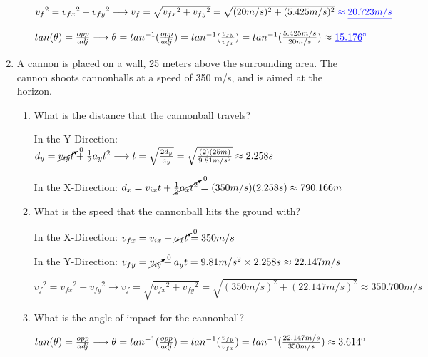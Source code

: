 \documentclass[letterpaper, 12pt]{article}
\begin{document}
\begin{enumerate}
\begin{enumerate}
	$ {v_f}^2 = {v_{fx}}^2 + {v_{fy}}^2 \longrightarrow {v_f} = \sqrt{{v_{fx}}^2 + {v_{fy}}^2} = \sqrt{(20 m/s)^2 + (5.425 m/s)^2}  \color{blue} \approx \underline{20.723 m/s}  $
	\color{red}	
	
		$tan(\theta) = \frac{opp}{adj} \longrightarrow \theta = tan^{-1}(\frac{opp}{adj}) = tan^{-1}(\frac{v_{fy}}{v_{fx}}) =  tan^{-1}(\frac{5.425 m/s}{20 m/s}) \approx \color{blue} \underline{15.176} \degree  $
	
	
	\color{black}
	
	
	
\end{enumerate}


\item A cannon is placed on a wall, 25 meters above the surrounding area.  The cannon shoots cannonballs at a speed of 350 m/s, and is aimed at the horizon.  
\begin{enumerate}
	\item What is the distance that the cannonball travels?
	\color{red}

	In the Y-Direction: $d_y = \cancelto{0}{v_{iy}t} + \frac{1}{2}a_y t^2 \longrightarrow t = \sqrt{\frac{2 d_y}{a_y}} = \sqrt{\frac{(2) (25m)}{9.81 m/s^2}} \approx 2.258 s $

In the X-Direction: $d_x = v_{ix} t + \cancelto{0}{\frac{1}{2}a_x t^2}  = (350 m/s)(2.258s) \approx 790.166 m $

\color{black}

	\item What is the speed that the cannonball hits the ground with?
	\color{red}
	
In the X-Direction: $ v_{fx} = v_{ix} + \cancelto{0}{a_x t} = 350 m/s$

In the Y-Direction: $ v_{fy} = \cancelto{0}{v_{iy}} + a_y t = 9.81 m/s^2 \times 2.258s \approx 22.147 m/s$

$ {v_f}^2 = {v_{fx}}^2 + {v_{fy}}^2 \longrightarrow {v_f} = \sqrt{{v_{fx}}^2 + {v_{fy}}^2} = \sqrt{(350 m/s)^2 + (22.147 m/s)^2} \approx 350.700 m/s  $
\color{black}


	\item What is the angle of impact for the cannonball?	
	\color{red}
	
$tan(\theta) = \frac{opp}{adj} \longrightarrow \theta = tan^{-1}(\frac{opp}{adj}) = tan^{-1}(\frac{v_{fy}}{v_{fx}}) =  tan^{-1}(\frac{22.147 m/s}{350 m/s}) \approx 3.614 \degree  $
\color{black}


\end{enumerate}



\end{enumerate}
\end{document}
